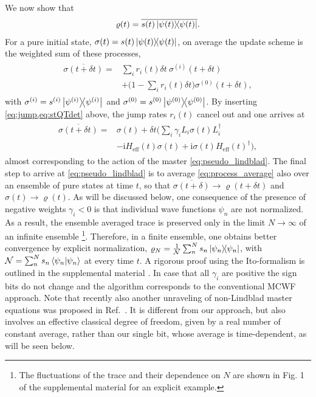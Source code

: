 \documentclass[twocolumn,prl,superscriptaddress]{revtex4-2}
\renewcommand{\i}{\mathrm i}
\begin{document}
We now show that 
\begin{align}
	\varrho(t) = \overline{s(t) \dyad{\psi(t)}}.
\end{align}
For a pure initial state, $\sigma(t) = s(t) \dyad{\psi(t)}$, on average the update scheme is the weighted sum of these processes,
\begin{align}
	\begin{aligned}
		\overline{ \sigma (t+  \delta t)} =& \sum_i r_i(t) \delta t\  \sigma^{(i)}(t +\delta t) \\ &+ \bigg(1-\sum_i r_i(t) \delta t\bigg)  \sigma^{(0)}(t +\delta t),
	\end{aligned}
\end{align}
with $\sigma^{(i)} = s^{(i)} \dyad{\psi^{(i)}}$ and $\sigma^{(0)} = s^{(0)} \dyad{\psi^{(0)}}$. By inserting \cref{eq:jump,eq:stQTdet} above, the jump rates $r_i(t)$ cancel out and one arrives at 
\begin{align}
	\begin{split}
		\overline{ \sigma (t+  \delta t)} =& \sigma(t) + \delta t \bigg( \sum_i \gamma_i L_i \sigma(t) L_i^\dagger \\ & - \i H_\mathrm{eff}(t) \sigma(t) + \i \sigma(t) H_\mathrm{eff}(t)^\dagger \bigg),
	\end{split}
	\label{eq:process_average}
\end{align}
almost corresponding to the action of the master \cref{eq:pseudo_lindblad}. 
The final step to arrive at \cref{eq:pseudo_lindblad} is to average \cref{eq:process_average} also over an ensemble of pure states at time $t$, so that $\overline{\sigma(t+\delta)}\to\varrho(t+\delta t)$ and $\sigma(t)\to\varrho(t)$.
As will be discussed below, one consequence of the presence of negative weights $\gamma_i<0$ is that individual wave functions $\psi_n$ are not normalized. As a result, the ensemble averaged trace is preserved only in the limit $N\to\infty$ of an infinite ensemble \footnote{The fluctuations of the trace and their dependence on $N$ are shown in Fig. 1 of the supplemental material \cite{supp_TBeckerCNetzerAEckardt2023} for an explicit example.}.
Therefore, in a finite ensemble, one obtains better convergence by explicit normalization, $\varrho_N = \frac{1}{\mathcal{N}}  \sum_n^N s_n \dyad{\psi_n}$, with $\mathcal{N} = \sum_n^N s_n \braket{\psi_n}{\psi_n}$ at every time $t$.
A rigorous proof using the Ito-formalism is outlined in the supplemental material \cite{supp_TBeckerCNetzerAEckardt2023}. In case that all $\gamma_i$ are positive the sign bits do not change and the algorithm corresponds to the conventional MCWF approach. Note that recently also another unraveling of non-Lindblad master equations was proposed in Ref.~\cite{DonvilMGinanneschi2022}. It is different from our approach, but also involves an effective classical degree of freedom, given by a real number of constant average, rather than our single bit, whose average is time-dependent, as will be seen below. 
\end{document}
